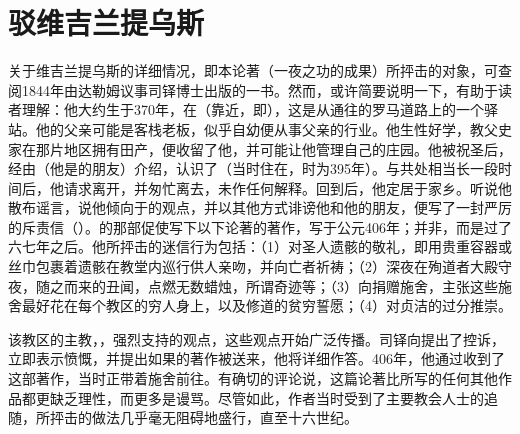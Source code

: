 
\chapter{驳维吉兰提乌斯}


关于维吉兰提乌斯的详细情况，即本论著（一夜之功的成果）所抨击的对象，可查阅1844年由达勒姆议事司铎博士出版的一书。然而，或许简要说明一下，有助于读者理解：他大约生于370年，在（靠近，即），这是从通往的罗马道路上的一个驿站。他的父亲可能是客栈老板，似乎自幼便从事父亲的行业。他生性好学，教父史家在那片地区拥有田产，便收留了他，并可能让他管理自己的庄园。他被祝圣后，经由（他是的朋友）介绍，认识了（当时住在，时为395年）。与共处相当长一段时间后，他请求离开，并匆忙离去，未作任何解释。回到后，他定居于家乡。听说他散布谣言，说他倾向于的观点，并以其他方式诽谤他和他的朋友，便写了一封严厉的斥责信（）。的那部促使写下以下论著的著作，写于公元406年；并非，而是过了六七年之后。他所抨击的迷信行为包括：（1）对圣人遗骸的敬礼，即用贵重容器或丝巾包裹着遗骸在教堂内巡行供人亲吻，并向亡者祈祷；（2）深夜在殉道者大殿守夜，随之而来的丑闻，点燃无数蜡烛，所谓奇迹等；（3）向捐赠施舍，主张这些施舍最好花在每个教区的穷人身上，以及修道的贫穷誓愿；（4）对贞洁的过分推崇。\par

该教区的主教，，强烈支持的观点，这些观点开始广泛传播。司铎向提出了控诉，立即表示愤慨，并提出如果的著作被送来，他将详细作答。406年，他通过收到了这部著作，当时正带着施舍前往。有确切的评论说，这篇论著比所写的任何其他作品都更缺乏理性，而更多是谩骂。尽管如此，作者当时受到了主要教会人士的追随，所抨击的做法几乎毫无阻碍地盛行，直至十六世纪。\par

